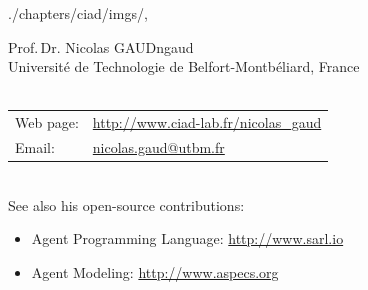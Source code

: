 \begin{graphicspathcontext}{{./chapters/ciad/imgs/},\old}

\begin{textpictureframe}{Prof\string.\,Dr\string. Nicolas GAUD}{ngaud}
	 \\[.25cm]
	
	{\scriptsize Universit\'e de Technologie de Belfort-Montb\'eliard, France} \\[.25cm]
	
	 \\[.25cm]

	\scriptsize \begin{tabularx}{\linewidth}{@{}lX@{}}
		Web page: & \url{http://www.ciad-lab.fr/nicolas_gaud} \\
		Email: & \href{mailto:nicolas.gaud@utbm.fr}{nicolas.gaud@utbm.fr} \\
	\end{tabularx} \\[.5cm]

	\scriptsize See also his open-source contributions:\begin{itemize}
		\item Agent Programming Language: \url{http://www.sarl.io}
		\item Agent Modeling: \url{http://www.aspecs.org}
	\end{itemize}
\end{textpictureframe}

\end{graphicspathcontext}
